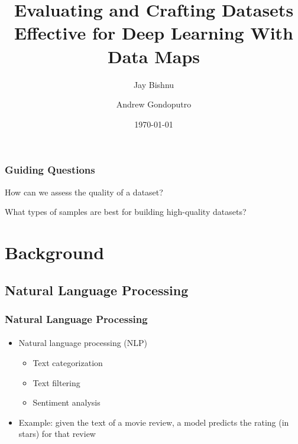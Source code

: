 \documentclass[
	11pt,
]{beamer}
\title[Deep Learning with Data Maps]{Evaluating and Crafting Datasets Effective for Deep Learning With Data Maps}
\author[Institute for Computing in Research]{Jay Bishnu \and Andrew Gondoputro}
\institute[ICR]{Institute for Computing In Research \\ \smallskip }
\date{\today}
\begin{document}
\begin{frame}
	\titlepage
\end{frame}



\begin{frame}
	\frametitle{Guiding Questions}
	\fontsize{18}{20}\selectfont
	\begin{block}
		\huge How can we assess the quality of a dataset?
	\end{block}
	\vspace{0.5in}
	\begin{block}
		\huge What types of samples are best for building high-quality datasets?
	\end{block}
\end{frame}


\section{Background}


\subsection{Natural Language Processing}
\begin{frame}
	\frametitle{Natural Language Processing}
	\framesubtitle{}

	\begin{itemize}
		\item Natural language processing (NLP)
		      \begin{itemize}
			      \item Text categorization
			      \item Text filtering
			      \item Sentiment analysis
		      \end{itemize}
		\item Example: given the text of a movie review, a model predicts the rating (in stars) for that review
	\end{itemize}

	\bigskip

\end{frame}
\end{document}
